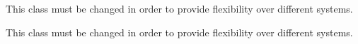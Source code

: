 
\begin{DoxyRefList}
\item[\label{todo__todo000001}%
\hypertarget{todo__todo000001}{}%
Class \hyperlink{classCucumber_1_1SystemConfiguration}{Cucumber\+:\+:System\+Configuration} ]This class must be changed in order to provide flexibility over different systems.  
\item[\label{todo__todo000002}%
\hypertarget{todo__todo000002}{}%
Class \hyperlink{classSystemConfiguration}{System\+Configuration} ]This class must be changed in order to provide flexibility over different systems. 
\end{DoxyRefList}